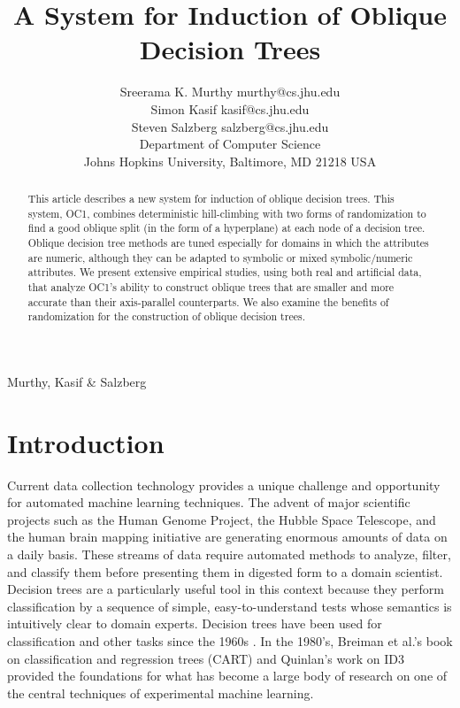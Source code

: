 
%
{Murthy, Kasif \& Salzberg}

\title {A System for Induction of Oblique Decision Trees}
\author {\name Sreerama K. Murthy \email murthy@cs.jhu.edu \\
         \name Simon Kasif \email kasif@cs.jhu.edu \\
         \name Steven Salzberg \email salzberg@cs.jhu.edu \\
         \addr Department of Computer Science \\
         Johns Hopkins University,
         Baltimore, MD 21218 USA}

\maketitle

\begin{abstract}
This article describes a new system for induction of oblique decision
trees.  This system, OC1, combines deterministic hill-climbing with
two forms of randomization to find a good oblique split (in the form
of a hyperplane) at each node of a decision tree.  Oblique decision
tree methods are tuned especially for domains in which the attributes
are numeric, although they can be adapted to symbolic or mixed
symbolic/numeric attributes.  We present extensive empirical studies,
using both real and artificial data, that analyze OC1's ability to
construct oblique trees that are smaller and more accurate than their
axis-parallel counterparts.  We also examine the benefits of
randomization for the construction of oblique decision trees.
\end{abstract}

\section{Introduction}
\label{section:intro}

Current data collection technology provides a unique challenge and
opportunity for automated machine learning techniques.  The advent of
major scientific projects such as the Human Genome Project, the Hubble
Space Telescope, and the human brain mapping initiative are generating
enormous amounts of data on a daily basis.  These streams of data
require automated methods to analyze, filter, and classify them before
presenting them in digested form to a domain scientist.  Decision
trees are a particularly useful tool in this context because they
perform classification by a sequence of simple, easy-to-understand
tests whose semantics is intuitively clear to domain experts.
Decision trees have been used for classification and other tasks
since the 1960s \cite{moret/82,safavin/landgrebe/91}.  In the 1980's,
Breiman et al.'s book on classification and regression trees (CART)
and Quinlan's work on ID3 \cite{quinlan/83,quinlan/86} provided the
foundations for what has become a large body of research on one of the
central techniques of experimental machine learning.


